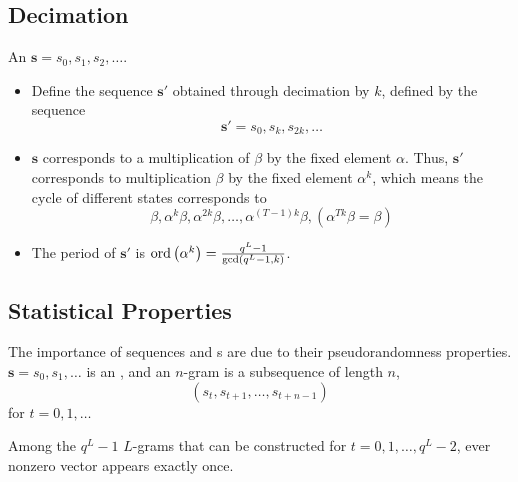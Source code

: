 \subsection{Decimation}\label{subsec:Decimation}
An  $\mathbf{s} = s_{0}, s_{1}, s_{2}, \ldots$.
\begin{itemize}[noitemsep]
\item Define the sequence $\mathbf{s}'$ obtained through decimation by $k$, defined by the sequence
  \begin{equation*}
    \mathbf{s}' = s_{0}, s_{k}, s_{2k}, \ldots
  \end{equation*}
\item $\mathbf{s}$ corresponds to a multiplication of $\beta$ by the fixed element $\alpha$. Thus, $\mathbf{s}'$ corresponds to multiplication $\beta$ by the fixed element $\alpha^{k}$, which means the cycle of different states corresponds to
  \begin{equation*}
    \beta, \alpha^{k}\beta, \alpha^{2k}\beta, \ldots, \alpha^{(T-1)k}\beta, \left( \alpha^{Tk}\beta = \beta \right)
  \end{equation*}
\item The period of $\mathbf{s}'$ is $\operatorname{\operatorname{ord}} \left( \alpha^{k} \right) = \frac{q^{L}-1}{\gcd \left( q^{L}-1, k \right)}$.
\end{itemize}

\subsection{Statistical Properties}\label{subsec:LFSR_Statistical_Properties}
The importance of  sequences and s are due to their pseudorandomness properties.
$\mathbf{s} = s_{0}, s_{1}, \ldots$ is an , and an $n$-gram is a subsequence of length $n$,
\begin{equation*}
  \left( s_{t}, s_{t+1}, \ldots, s_{t+n-1} \right)
\end{equation*}
for $t=0, 1, \ldots$

\begin{theorem}
  Among the $q^{L}-1$ $L$-grams that can be constructed for $t = 0, 1, \ldots, q^{L}-2$, ever nonzero vector appears exactly once.
\end{theorem}

